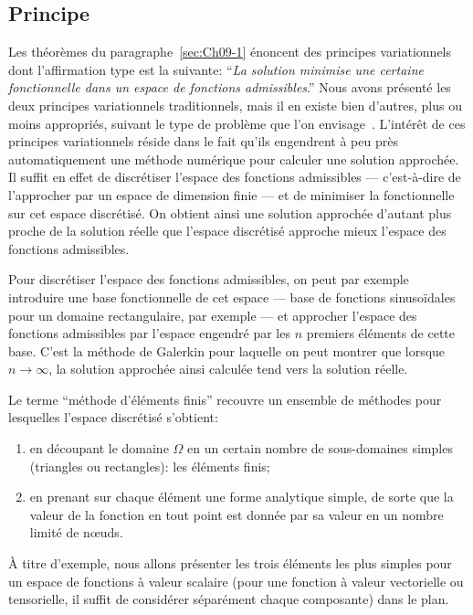 \subsection{Principe} \label{ssec:Ch09-3.1}
Les théorèmes du paragraphe~\ref{sec:Ch09-1} énoncent des principes variationnels dont l'affirmation type est la suivante: ``\emph{La solution minimise une certaine fonctionnelle dans un espace de fonctions admissibles}.''
Nous avons présenté les deux principes variationnels traditionnels, mais il en existe bien d'autres, plus ou moins appropriés, suivant le type de problème que l'on envisage~\cite{Valid-77}.
L'intérêt de ces principes variationnels réside dans le fait qu'ils engendrent à peu près automatiquement une méthode numérique pour calculer une solution approchée.
Il suffit en effet de discrétiser l'espace des fonctions admissibles --- c'est-à-dire de l'approcher par un espace de dimension finie --- et de minimiser la fonctionnelle sur cet espace discrétisé.
On obtient ainsi une solution approchée d'autant plus proche de la solution réelle que l'espace discrétisé approche mieux l'espace des fonctions admissibles. 

Pour discrétiser l'espace des fonctions admissibles, on peut par exemple introduire une base fonctionnelle de cet espace --- base de fonctions sinusoïdales pour un domaine rectangulaire, par exemple --- et approcher l'espace des fonctions admissibles par l'espace engendré par les $n$ premiers éléments de cette base. 
C'est la méthode de Galerkin pour laquelle on peut montrer que lorsque $n\rightarrow\infty$, la solution approchée ainsi calculée tend vers la solution réelle. 

Le terme ``méthode d'éléments finis'' recouvre un ensemble de méthodes pour lesquelles l'espace discrétisé s'obtient: 
\begin{enumerate}
    \item en découpant le domaine $\Omega$ en un certain nombre de sous-domaines simples (triangles ou rectangles): les éléments finis; 
    \item en prenant sur chaque élément une forme analytique simple, de sorte que la valeur de la fonction en tout point est donnée par sa valeur en un nombre limité de nœuds.
\end{enumerate}
À titre d'exemple, nous allons présenter les trois éléments les  plus simples pour un espace de fonctions à valeur scalaire  (pour une fonction à valeur vectorielle ou tensorielle, il suffit de  considérer séparément chaque composante) dans le plan.  

